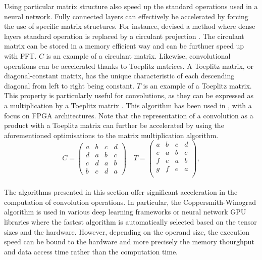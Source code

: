 Using particular matrix structure also speed up the standard operations used in
a neural network. Fully connected layers can  effectively be accelerated by
forcing the use of specific matrix structures. For instance,
\citeauthor{DBLP:conf/iccv/ChengYFKCC15} devised a method where dense layers
standard operation is replaced by a circulant projection
\cite{DBLP:conf/iccv/ChengYFKCC15}. The circulant matrix can be stored in a
memory efficient way and can be furthuer speed up with \ac{FFT}. $C$ is an
example of a circulant matrix. Likewise, convolutional operations can be
accelerated thanks to Toeplitz matrices. A Toeplitz matrix, or diagonal-constant
matrix, has the unique characteristic of each descending diagonal from left to
right being constant. $T$ is an example of a Toeplitz matrix. This property is
particularly useful for convolutions, as they can be expressed as a
multiplication by a Toeplitz matrix \cite{gray2006toeplitz}. This algorithm has
been used in \cite{liao2019compressing}, with a focus on \ac{FPGA}
architectures. Note that the representation of a convolution as a product with a
Toeplitz matrix can further be accelerated by using the aforementioned
optimisations to the matrix multiplication algorithm.\\

\[
C = 
\begin{pmatrix}
    a & b & c & d \\
    d & a & b & c \\
    c & d & a & b \\
    b & c & d & a
\end{pmatrix}
\quad
T = 
\begin{pmatrix}
a & b & c & d \\
e & a & b & c \\
f & e & a & b \\
g & f & e & a \\
\end{pmatrix},
\]\\



The algorithms presented in this section offer significant acceleration in the
computation of convolution operations. In particular, the Coppersmith-Winograd
algorithm is used in various deep learning frameworks
\cite{DBLP:journals/corr/AbadiABBCCCDDDG16,DBLP:conf/nips/PaszkeGMLBCKLGA19} or
neural network \ac{GPU} libraries \cite{nvidia_cudnn} where the fastest
algorithm is automatically selected based on the tensor sizes and the hardware.
However, depending on the operand size, the execution speed can be bound to the
hardware and more precisely the memory thourghput and data access time rather
than the computation time.
\cite{DBLP:journals/pc/WhaleyPD01,DBLP:journals/cca/DrevetIS10}


